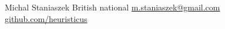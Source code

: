 \documentclass[a4paper,10pt]{article}
\begin{document}
\thispagestyle{empty}
\pagestyle{empty}
  {\Huge Michal Staniaszek} \hspace*{0.3cm}British national \hspace*{0.3cm} \href{mailto: m.staniaszek@gmail.com}{m.staniaszek@gmail.com} \hspace*{0.3cm} \href{https://github.com/heuristicus}{github.com/heuristicus}


\vspace*{1pt}
\end{document}
